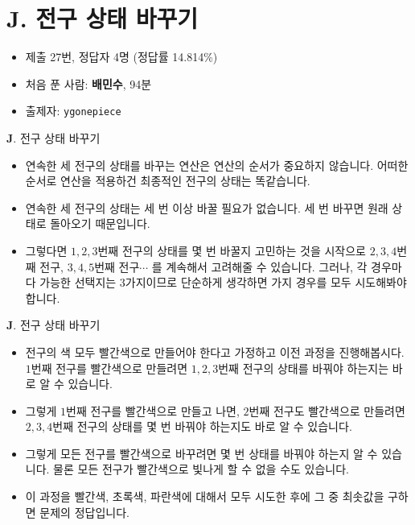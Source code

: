 \section{J. 전구 상태 바꾸기}

\begin{frame} %
    \begin{itemize}
        \item 제출 27번, 정답자 4명 (정답률 14.814\%)
        \item 처음 푼 사람: \textbf{배민수}, 94분
        \item 출제자: \texttt{ygonepiece}
    \end{itemize}
\end{frame}

\begin{frame}{\textbf{J}. 전구 상태 바꾸기}
    \begin{itemize}
        \item 연속한 세 전구의 상태를 바꾸는 연산은 연산의 순서가 중요하지 않습니다. 어떠한 순서로 연산을 적용하건 최종적인 전구의 상태는 똑같습니다.
        \item 연속한 세 전구의 상태는 세 번 이상 바꿀 필요가 없습니다. 세 번 바꾸면 원래 상태로 돌아오기 때문입니다.
        \item 그렇다면 $1, 2, 3$번째 전구의 상태를 몇 번 바꿀지 고민하는 것을 시작으로 $2, 3, 4$번째 전구, $3, 4, 5$번째 전구$\cdots$ 를 계속해서 고려해줄 수 있습니다. 그러나, 각 경우마다 가능한 선택지는 $3$가지이므로 단순하게 생각하면 가지 경우를 모두 시도해봐야 합니다.
    \end{itemize}
\end{frame}

\begin{frame}{\textbf{J}. 전구 상태 바꾸기}
    \begin{itemize}
        \item 전구의 색 모두 빨간색으로 만들어야 한다고 가정하고 이전 과정을 진행해봅시다. $1$번째 전구를 빨간색으로 만들려면 $1, 2, 3$번째 전구의 상태를 바꿔야 하는지는 바로 알 수 있습니다.
        \item 그렇게 $1$번째 전구를 빨간색으로 만들고 나면, $2$번째 전구도 빨간색으로 만들려면 $2, 3, 4$번째 전구의 상태를 몇 번 바꿔야 하는지도 바로 알 수 있습니다.
        \item 그렇게 모든 전구를 빨간색으로 바꾸려면 몇 번 상태를 바꿔야 하는지 알 수 있습니다. 물론 모든 전구가 빨간색으로 빛나게 할 수 없을 수도 있습니다.
        \item 이 과정을 빨간색, 초록색, 파란색에 대해서 모두 시도한 후에 그 중 최솟값을 구하면 문제의 정답입니다.
    \end{itemize}
\end{frame}